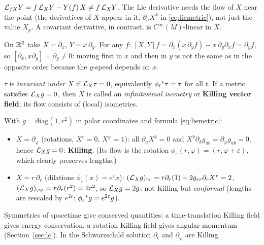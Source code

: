 \begin{pitfall}
$\mathcal{L}_{fX}Y=f\,\mathcal{L}_XY-Y(f)\,X\neq f\,\mathcal{L}_XY$. The Lie derivative needs the flow of $X$ near the point (the derivatives of $X$ appear in it, \eg $\partial_aX^k$ in \eqref{eq:liemetric}), not just the value $X_p$. A covariant derivative, in contrast, is $C^\infty(M)$-linear in $X$.
\end{pitfall}

\begin{example}
On $\mathbb{R}^2$ take $X=\partial_x$, $Y=x\,\partial_y$. For any $f$: $[X,Y]f=\partial_x(x\,\partial_yf)-x\,\partial_y\partial_xf=\partial_yf$, so $[\partial_x,x\partial_y]=\partial_y\neq0$: moving first in $x$ and then in $y$ is not the same as in the opposite order because the $y$-speed depends on $x$.
\end{example}

\begin{formal}
$\tau$ is \emph{invariant under $X$} if $\mathcal{L}_X\tau=0$, equivalently $\phi_t{}^{*}\tau=\tau$ for all $t$. If a metric satisfies $\mathcal{L}_Xg=0$, then $X$ is called an \emph{infinitesimal isometry} or \textbf{Killing vector field}; its flow consists of (local) isometries.
\end{formal}

\begin{example}
With $g=\mathrm{diag}(1,r^2)$ in polar coordinates and formula \eqref{eq:liemetric}:
\begin{itemize}[nosep]
\item $X=\partial_\varphi$ (rotations, $X^r=0$, $X^\varphi=1$): all $\partial_aX^k=0$ and $X^k\partial_kg_{ab}=\partial_\varphi g_{ab}=0$, hence $\mathcal{L}_Xg=0$: \textbf{Killing}. (Its flow is the rotation $\phi_\varepsilon(r,\varphi)=(r,\varphi+\varepsilon)$, which clearly preserves lengths.)
\item $X=r\,\partial_r$ (dilations $\phi_\varepsilon(x)=e^\varepsilon x$): $(\mathcal{L}_Xg)_{rr}=r\partial_r(1)+2g_{rr}\partial_rX^r=2$, $(\mathcal{L}_Xg)_{\varphi\varphi}=r\partial_r(r^2)=2r^2$, so $\mathcal{L}_Xg=2g$: not Killing but \emph{conformal} (lengths are rescaled by $e^{2\varepsilon}$: $\phi_\varepsilon{}^{*} g=e^{2\varepsilon}g$). \checkmark
\end{itemize}
\end{example}

\begin{intuition}
Symmetries of spacetime give conserved quantities: a time-translation Killing field gives energy conservation, a rotation Killing field gives angular momentum (Section~\ref{sec:lc}). In the Schwarzschild solution $\partial_t$ and $\partial_\varphi$ are Killing.
\end{intuition}
